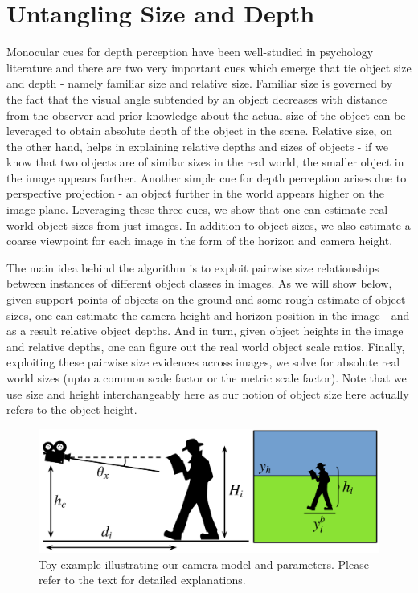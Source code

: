 \section{Untangling Size and Depth}
Monocular cues for depth perception have been well-studied in psychology literature and there are two very important cues which emerge that tie object size and depth -  namely familiar size and relative size. Familiar size is governed by the fact that the visual angle subtended by an object decreases with distance from the observer and prior knowledge about the actual size of the object can be leveraged to obtain absolute depth of the object in the scene. Relative size, on the other hand, helps in explaining relative depths and sizes of objects - if we know that two objects are of similar sizes in the real world, the smaller object in the image appears farther. Another simple cue for depth perception arises due to perspective projection - an object further in the world appears higher on the image plane. Leveraging these three cues, we show that one can estimate real world object sizes from just images. In addition to object sizes, we also estimate a coarse viewpoint for each image in the form of the horizon and camera height. 

The main idea behind the algorithm is to exploit pairwise size relationships between instances of different object classes in images. As we will show below, given support points of objects on the ground and some rough estimate of object sizes, one can estimate the camera height and horizon position in the image - and as a result relative object depths. And in turn, given object heights in the image and relative depths, one can figure out the real world object scale ratios. Finally, exploiting these pairwise size evidences across images, we solve for absolute real world sizes (upto a common scale factor or the metric scale factor). Note that we use size and height interchangeably here as our notion of object size here actually refers to the object height.
\begin{figure}
  \centering
  \includegraphics[width=\textwidth]{figures/amodal/Perspective.png}
  \caption{ Toy example illustrating our camera model and parameters. Please refer to the text for detailed explanations. }
\end{figure}

